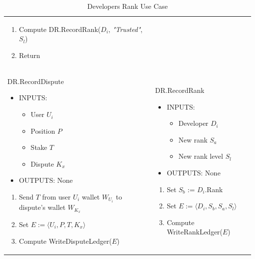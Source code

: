 \begin{table}[H]
\begin{tabular}{|p{}p{}|}
\begin{enumerate}
	\begin{enumerate}
		\item Compute \textsf{DR.RecordRank}($D_i$, \textit{"Trusted"}, $S_l$)
		\item Return
	\end{enumerate}
\end{enumerate} \\ \vspace{0.1cm}
\textsf{DR.RecordDispute}
\vspace{-0.3cm}
\begin{itemize}
	\item INPUTS:
	\vspace{-0.3cm}
	\begin{itemize}
		\item User $U_i$
		\item Position $P$
		\item Stake $T$
		\item Dispute $K_x$
	\end{itemize}
	\item OUTPUTS: None
\end{itemize}
\begin{enumerate}
	\item Send $T$ from user $U_i$ wallet $W_{U_i}$ to dispute's wallet $W_{K_x}$
	\item Set $E := \langle U_i, P, T, K_x\rangle$
	\item Compute \textsf{WriteDisputeLedger}($E$)
\end{enumerate} & \vspace{0.1cm}
\textsf{DR.RecordRank}
\vspace{-0.3cm}
\begin{itemize}
	\item INPUTS:
	\vspace{-0.3cm}
	\begin{itemize}
		\item Developer $D_i$
		\item New rank $S_a$
		\item New rank level $S_l$
	\end{itemize}
	\item OUTPUTS: None
\end{itemize}
\begin{enumerate}
	\item Set $S_b$ := $D_i$.Rank
	\item Set $E := \langle D_i, S_b, S_a, S_l\rangle$
	\item Compute \textsf{WriteRankLedger}($E$)
\end{enumerate} \\
\hline
\end{tabular}
\caption{Developers Rank Use Case}
\label{table: dr_protocol}
\end{table}


